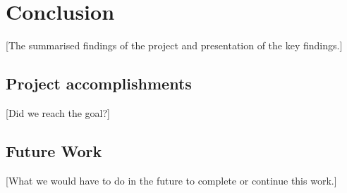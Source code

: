 \section{Conclusion}\label{Conclusion}
[The summarised findings of the project and presentation of the key findings.]
    \subsection{Project accomplishments}\label{Project accomplishments}
    [Did we reach the goal?]
    \subsection{Future Work}\label{Future Work}
    [What we would have to do in the future to complete or continue this work.]
